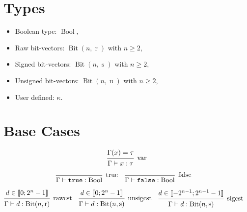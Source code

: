 \documentclass[english, 12pt]{article}
\DeclareMathOperator{\Bit}{Bit}
\DeclareMathOperator{\Bool}{Bool}
\DeclareMathOperator{\Raw}{r}
\DeclareMathOperator{\Signed}{s}
\DeclareMathOperator{\Unsigned}{u}
\begin{document}
\section{Types}
\begin{itemize}
    \item Boolean type: $\Bool$,
    \item Raw bit-vectors: $\Bit(n, \Raw)$ with $n \geqslant 2$,
    \item Signed bit-vectors: $\Bit(n, \Signed)$ with $n \geqslant 2$,
    \item Unsigned bit-vectors: $\Bit(n, \Unsigned)$ with $n \geqslant 2$,
    \item User defined: $\kappa$.
\end{itemize}

\section{Base Cases}
\[
    \begin{prooftree}
        \hypo{\Gamma(x) = \tau}
        \infer1[var]{\Gamma \vdash x : \tau}
    \end{prooftree}
\]

\begin{align*}
     &
    \begin{prooftree}
        \infer0[true]{\Gamma \vdash \texttt{true} : \Bool}
    \end{prooftree}
     &
     &
    \begin{prooftree}
        \infer0[false]{\Gamma \vdash \texttt{false} : \Bool}
    \end{prooftree}
\end{align*}

\begin{align*}
     &
    \begin{prooftree}
        \hypo{d \in \llbracket0; 2^{n} - 1\rrbracket}
        \infer1[rawcst]{\Gamma \vdash d : \Bit(n, \Raw)}
    \end{prooftree}
     &
     &
    \begin{prooftree}
        \hypo{d \in \llbracket0; 2^{n} - 1\rrbracket}
        \infer1[unsigcst]{\Gamma \vdash d : \Bit(n, \Signed)}
    \end{prooftree}
     &
     &
    \begin{prooftree}
        \hypo{d \in \llbracket-2^{n-1}; 2^{n-1}-1\rrbracket}
        \infer1[sigcst]{\Gamma \vdash d : \Bit(n, \Signed)}
    \end{prooftree}
\end{align*}
\end{document}
